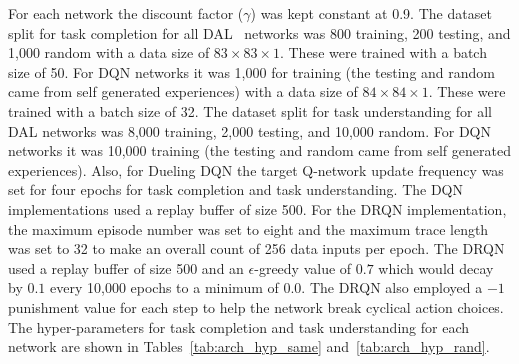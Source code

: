 \documentclass[12pt,american]{report}
\begin{document}
For each network the discount factor ($\gamma$) was kept constant at 0.9.  The dataset split for task completion for all DAL~\cite{markovikj2014deep} networks was 800 training, 200 testing, and 1,000 random with a data size of $83\times 83\times 1$.  These were trained with a batch size of 50. For DQN networks it was 1,000 for training (the testing and random came from self generated experiences) with a data size of $84\times 84\times 1$. These were trained with a batch size of 32. The dataset split for task understanding for all DAL networks was 8,000 training, 2,000 testing, and 10,000 random. For DQN networks it was 10,000 training (the testing and random came from self generated experiences).  Also, for Dueling DQN the target Q-network update frequency was set for four epochs for task completion and task understanding. The DQN implementations used a replay buffer of size 500. For the DRQN implementation, the maximum episode number was set to eight and the maximum trace length was set to 32 to make an overall count of 256 data inputs per epoch. The DRQN used a replay buffer of size 500 and an $\epsilon$-greedy value of $0.7$ which would decay by $0.1$ every 10,000 epochs to a minimum of 0.0. The DRQN also employed a $-1$ punishment value for each step to help the network break cyclical action choices. The hyper-parameters for task completion and task understanding for each network are shown in Tables~\ref{tab:arch_hyp_same} and~\ref{tab:arch_hyp_rand}.  
\end{document}
